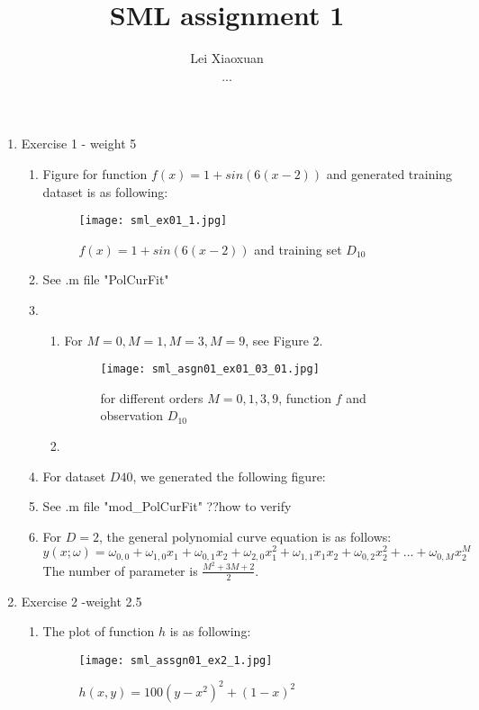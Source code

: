 \documentclass{article}
\author{Lei Xiaoxuan\\...}
\title{SML assignment 1}
\begin{document}
\maketitle
\begin{enumerate}
\item Exercise 1 - weight 5
\begin{enumerate}
\item Figure for function $f(x)=1+sin(6(x-2))$ and generated training dataset is as following:

\begin{figure}[h]
\begin{center}
\texttt{[image: sml\_ex01\_1.jpg]}
\caption{$f(x)=1+sin(6(x-2))$ and training set $D_{10}$}
\label{fig:label}
\end{center}
\end{figure}

\item See .m file "PolCurFit"
\item 
\begin{enumerate}
\item For $M=0,M=1,M=3,M=9$, see Figure 2.
\begin{figure}[h]
\begin{center}
\texttt{[image: sml\_asgn01\_ex01\_03\_01.jpg]}
\caption{for different orders $M=0,1,3,9$, function $f$ and observation $D_{10}$}
\label{fig:label}
\end{center}
\end{figure}


\item 
\end{enumerate}
\item For dataset $D40$, we generated the following figure:
\item See .m file "mod\_PolCurFit"
??how to verify
\item For $D=2$, the general polynomial curve equation is as follows:
\[y(x;\omega)=\omega_{0,0}+\omega_{1,0}x_{1}+\omega_{0,1}x_{2}+\omega_{2,0}x_{1}^{2}+\omega_{1,1}x_{1}x_{2}+\omega_{0,2}x_{2}^{2}+...+\omega_{0,M}x_{2}^{M}\]
The number of parameter is $\frac{M^{2}+3M+2}{2}$. 
\end{enumerate}
\item Exercise 2 -weight 2.5
\begin{enumerate}
\item The plot of function $h$ is as following:
\begin{figure}[h]
\begin{center}
\texttt{[image: sml\_assgn01\_ex2\_1.jpg]}
\caption{$h(x,y)=100(y-x^{2})^{2}+(1-x)^{2}$}
\label{fig:label}
\end{center}
\end{figure}


\end{enumerate}
\end{enumerate}
\end{document}
